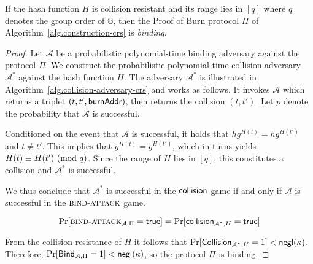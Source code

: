 \begin{theorem}[Binding]
  If the hash function $H$ is collision resistant and its range lies in $[q]$ where $q$ denotes the group order of $\mathbb{G}$, then the Proof of Burn protocol $\Pi$ of Algorithm~\ref{alg.construction-crs} is \emph{binding}.
\end{theorem}
\begin{proof}
  Let $\mathcal{A}$ be a probabilistic polynomial-time binding adversary against the protocol $\Pi$. We construct the probabilistic polynomial-time collision adversary $\mathcal{A}^*$ against the hash function $H$. The adversary $\mathcal{A}^*$ is illustrated in Algorithm~\ref{alg.collision-adversary-crs} and works as follows. It invokes $\mathcal{A}$ which returns a triplet $(t, t', \mathsf{burnAddr})$, then returns the collision $(t, t')$. Let $p$ denote the probability that $\mathcal{A}$ is successful.

  Conditioned on the event that $\mathcal{A}$ is successful, it holds that
  $h g^{H(t)} = h g^{H(t')}$ and $t \neq t'$. This implies that $g^{H(t)} = g^{H(t')}$, which in turns yields $H(t) \equiv H(t') \ (\mathrm{mod}\ q)$. Since the range of $H$ lies in $[q]$, this constitutes a collision and $\mathcal{A}^*$ is successful.

  We thus conclude that $\mathcal{A^*}$ is successful in the $\textsf{collision}$ game if and only if $\mathcal{A}$ is successful in the $\textsc{bind}\-\text{-}\-\textsc{attack}$ game.

  \[
    \Pr[\textsc{bind}\-\text{-}\-\textsc{attack}_{\mathcal{A},\Pi} = \mathsf{true}]
    =
    \Pr[\textsf{collision}_{\mathcal{A}^*,H} = \mathsf{true}]
  \]

  From the collision resistance of $H$ it follows that $\Pr[\textsf{Collision}_{\mathcal{A}^*,H} = 1] < \textsf{negl}(\kappa)$. Therefore,
  $\Pr[\textsf{Bind}_{\mathcal{A},\Pi} = 1] < \textsf{negl}(\kappa)$, so
  the protocol $\Pi$ is binding.
\end{proof}
